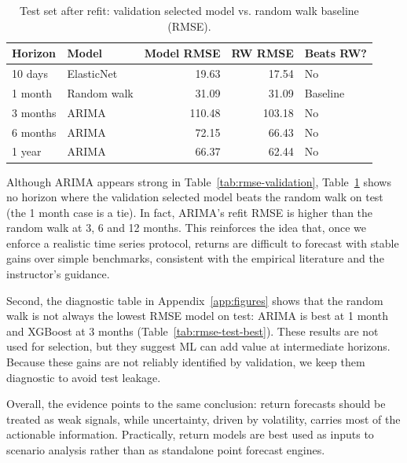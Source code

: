 \documentclass[11pt,a4paper]{article}
\begin{document}
\begin{table}[H]
\centering
\footnotesize
\setlength{\tabcolsep}{4pt}
\renewcommand{\arraystretch}{1.0}
\caption{Test set after refit: validation selected model vs. random walk baseline (RMSE).}
\label{tab:rmse-test}
\begin{tabular}{l l r r l}
\toprule
Horizon & Model & Model RMSE & RW RMSE & Beats RW? \\
\midrule
10 days  & ElasticNet & 19.63 & 17.54 & No \\
1 month  & Random walk & 31.09 & 31.09 & Baseline \\
3 months & ARIMA & 110.48 & 103.18 & No \\
6 months & ARIMA & 72.15 & 66.43 & No \\
1 year   & ARIMA & 66.37 & 62.44 & No \\
\bottomrule
\end{tabular}
\end{table}

\noindent Although ARIMA appears strong in Table~\ref{tab:rmse-validation}, Table~\ref{tab:rmse-test} shows no horizon where the validation selected model beats the random walk on test (the 1 month case is a tie). In fact, ARIMA’s refit RMSE is higher than the random walk at 3, 6 and 12 months. This reinforces the idea that, once we enforce a realistic time series protocol, returns are difficult to forecast with stable gains over simple benchmarks, consistent with the empirical literature and the instructor’s guidance.

\noindent Second, the diagnostic table in Appendix~\ref{app:figures} shows that the random walk is not always the lowest RMSE model on test: ARIMA is best at 1 month and XGBoost at 3 months (Table~\ref{tab:rmse-test-best}). These results are not used for selection, but they suggest ML can add value at intermediate horizons. Because these gains are not reliably identified by validation, we keep them diagnostic to avoid test leakage.

\noindent Overall, the evidence points to the same conclusion: return forecasts should be treated as weak signals, while uncertainty, driven by volatility, carries most of the actionable information. Practically, return models are best used as inputs to scenario analysis rather than as standalone point forecast engines.
\end{document}
